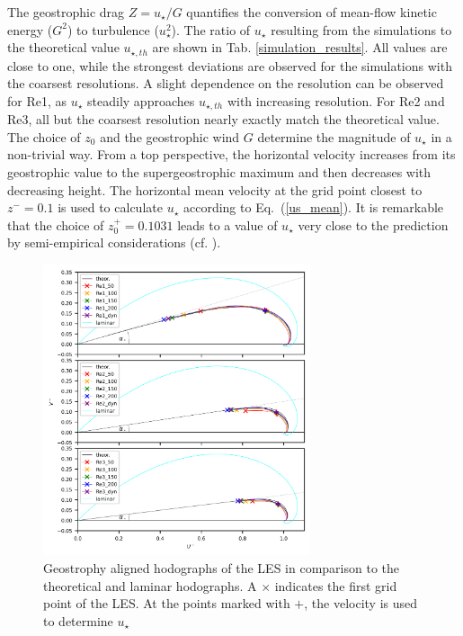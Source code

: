 \documentclass[a4paper,11pt]{article}
\begin{document}
The geostrophic drag $Z=u_\star/G$ quantifies the conversion of mean-flow kinetic energy ($G^2$) to turbulence ($u_{\star}^2$). The ratio of $u_{\star}$ resulting from the simulations to the theoretical value $u_{\star,th}$ are shown in Tab. \ref{simulation_results}. All values are close to one, while the strongest deviations are observed for the simulations with the coarsest resolutions. A slight dependence on the resolution can be observed for Re1, as $u_\star$ steadily approaches $u_{\star,th}$ with increasing resolution. For Re2 and Re3, all but the coarsest resolution nearly exactly match the theoretical value. The choice of $z_0$ and the geostrophic wind $G$ determine the magnitude of $u_\star$ in a non-trivial way. From a top perspective, the horizontal velocity increases from its geostrophic value to the supergeostrophic maximum and then decreases with decreasing height. The horizontal mean velocity at the grid point closest to $z^-=0.1$ is used to calculate $u_\star$ according to Eq.~(\ref{us_mean}). It is remarkable that the choice of $z_0^+=0.1031$ leads to a value of $u_{\star}$ very close to the prediction by semi-empirical considerations (cf. \cite{spalart1989theoretical}).

\begin{figure}[ht]
	\centering
	\includegraphics[width=0.7\textwidth]{figures_2024/d3y_3Re_hodograph}
  \caption{Geostrophy aligned hodographs of the LES in comparison to the theoretical and laminar hodographs. A $\times$ indicates the first grid point of the LES. At the points marked with $+$, the velocity is used to determine $u_\star$}
  \label{3Re_hodograph}
\end{figure}
\end{document}
